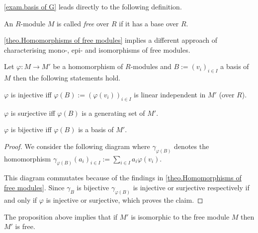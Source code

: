 \cref{exam.basis of G} leads directly to the following definition.
\begin{defin}
An $R$-module $M$ is called \emph{free} over $R$ if it has a base over $R$.
\end{defin}

\cref{theo.Homomorphisms of free modules} implies a different approach of characterising mono-, epi- and isomorphisms of free modules.
\begin{cor}
Let $\varphi\colon M\to M'$ be a homomorphism of $R$-modules and $B:=(v_i)_{i\in I}$ a basis of $M$ then the following statements hold.
\begin{exlist}
\item $\varphi$ is injective iff $\varphi(B):=(\varphi(v_i))_{i\in I}$ is linear independent in $M'$ (over $R$).
\item $\varphi$ is surjective iff $\varphi(B)$ is a generating set of $M'$.
\item $\varphi$ is bijective iff $\varphi(B)$ is a basis of $M'$.
\end{exlist}
\end{cor}
\begin{proof}
We consider the following diagram where $\gamma_{\varphi(B)}$ denotes the homomorphism $\gamma_{\varphi(B)}(a_i)_{i\in I}:=\sum_{i\in I}a_i\varphi(v_i)$.
\begin{center}
\end{center}
This diagram commutates because of the findings in \cref{theo.Homomorphisms of free modules}.
Since $\gamma_B$ is bijective $\gamma_{\varphi(B)}$ is injective or surjective respectively if and only if $\varphi$ is injective or surjective, which proves the claim.
\end{proof}
The proposition above implies that if $M'$ is isomorphic to the free module $M$ then $M'$ is free.


